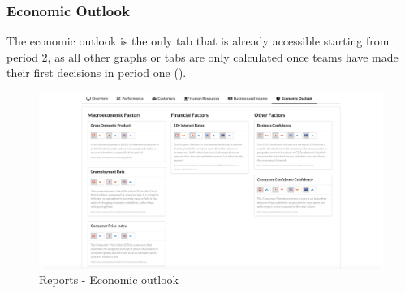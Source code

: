 \subsubsection{Economic Outlook}
The economic outlook is the only tab that is already accessible starting from period 2, as all other graphs or tabs are only calculated once teams have made their first decisions in period one ().
\begin{figure}[h!]
  \centering
  \includegraphics[scale=0.2]{img/application-overview/reports/06_economic_outlook.png}
  \caption{Reports - Economic outlook}
  \label{fig:reports_outlook}
\end{figure}
